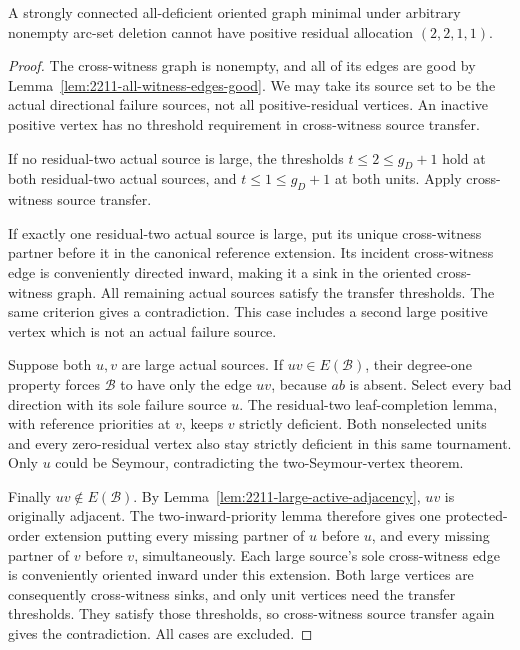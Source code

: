 \begin{theorem}[Exclusion of $(2,2,1,1)$]
\label{thm:no-two-two-one-one}
A strongly connected all-deficient oriented graph minimal under
arbitrary nonempty arc-set deletion cannot have positive residual
allocation $(2,2,1,1)$.
\end{theorem}
\begin{proof}
The cross-witness graph is nonempty, and all of its edges are good
by Lemma~\ref{lem:2211-all-witness-edges-good}.
We may take its source set to be the actual directional failure
sources, not all positive-residual vertices. An inactive positive
vertex has no threshold requirement in cross-witness source transfer.

If no residual-two actual source is large, the thresholds
$t\le2\le g_D+1$ hold at both residual-two actual sources, and
$t\le1\le g_D+1$ at both units. Apply cross-witness source transfer.

If exactly one residual-two actual source is large, put its unique
cross-witness partner before it in the canonical reference extension.
Its incident cross-witness edge is conveniently directed inward,
making it a sink in the oriented cross-witness graph.
All remaining actual sources satisfy the transfer thresholds.
The same criterion gives a contradiction. This case includes a
second large positive vertex which is not an actual failure source.

Suppose both $u,v$ are large actual sources.
If $uv\in E(\mathcal B)$, their degree-one property forces
$\mathcal B$ to have only the edge $uv$, because $ab$ is absent.
Select every bad direction with its sole failure source $u$.
The residual-two leaf-completion lemma, with reference
priorities at $v$, keeps $v$ strictly deficient.
Both nonselected units and every zero-residual vertex also stay
strictly deficient in this same tournament. Only $u$ could be
Seymour, contradicting the two-Seymour-vertex theorem.

Finally $uv\notin E(\mathcal B)$.
By Lemma~\ref{lem:2211-large-active-adjacency}, $uv$ is originally
adjacent. The two-inward-priority lemma therefore gives
one protected-order extension putting every missing partner of
$u$ before $u$, and every missing partner of $v$ before $v$,
simultaneously. Each large source's sole cross-witness edge is
conveniently oriented inward under this extension.
Both large vertices are consequently cross-witness sinks,
and only unit vertices need the transfer thresholds. They satisfy
those thresholds, so cross-witness source transfer again gives
the contradiction. All cases are excluded.
\end{proof}

